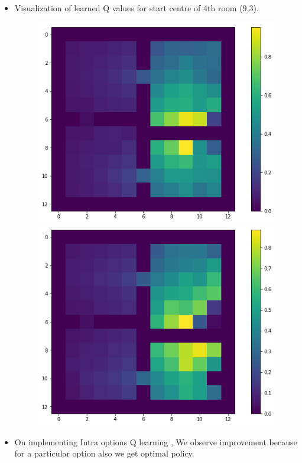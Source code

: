 \documentclass[a4paper]{article}
\begin{document}
\begin{itemize}
\item Visualization of learned Q values for start centre of 4th room (9,3).
\begin{figure}[htbp!]
\centering
\begin{minipage}{.5\textwidth}
  \centering
  \includegraphics[width=1\linewidth]{9379.png}
\end{minipage}%
\begin{minipage}{.5\textwidth}
  \centering
  \includegraphics[width=1\linewidth]{9399.png}
\end{minipage}
\end{figure}
\item On implementing Intra options Q learning , We observe improvement because for a particular option also we get optimal policy.

\end{itemize}
\end{document}
